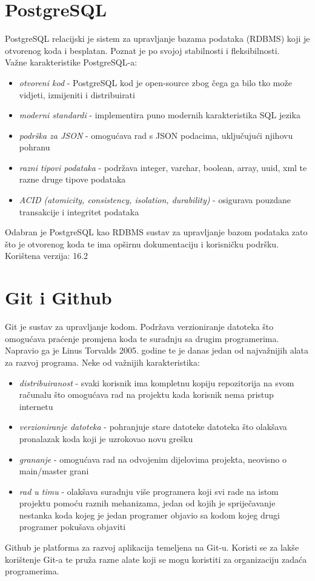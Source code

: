 \documentclass[zavrsnirad]{fer}
\begin{document}
\section{PostgreSQL}
\label{pog:postgresql}
PostgreSQL relacijski je sistem za upravljanje bazama podataka (RDBMS) koji je otvorenog koda i besplatan. Poznat je po svojoj stabilnosti i fleksibilnosti.
\\Važne karakteristike PostgreSQL-a:
\begin{itemize}
	\item \textit{otvoreni kod} - PostgreSQL kod je open-source zbog čega ga bilo tko može vidjeti, izmijeniti i distribuirati
	\item \textit{moderni standardi} - implementira puno modernih karakteristika SQL jezika
	\item \textit{podrška za JSON} - omogućava rad s JSON podacima, uključujući njihovu pohranu
	\item \textit{razni tipovi podataka} - podržava integer, varchar, boolean, array, uuid, xml te razne druge tipove podataka
	\item \textit{ACID (atomicity, consistency, isolation, durability)} - osigurava pouzdane transakcije i integritet podataka
\end{itemize}

Odabran je PostgreSQL kao RDBMS sustav za upravljanje bazom podataka zato što je otvorenog koda te ima opširnu dokumentaciju i korisničku podršku.
\\Korištena verzija: 16.2

\section{Git i Github}
Git je sustav za upravljanje kodom. Podržava verzioniranje datoteka što omogućava praćenje promjena koda te suradnju sa drugim programerima. Napravio ga je Linus Torvalds 2005. godine te je danas jedan od najvažnijih alata za razvoj programa. Neke od važnijih karakteristika:
\begin{itemize}
	\item \textit{distribuiranost} - svaki korisnik ima kompletnu kopiju repozitorija na svom računalu što omogućava rad na projektu kada korisnik nema pristup internetu
	\item \textit{verzioniranje datoteka} - pohranjuje stare datoteke datoteka što olakšava pronalazak koda koji je uzrokovao novu grešku
	\item \textit{grananje} - omogućava rad na odvojenim dijelovima projekta, neovisno o main/master grani
	\item \textit{rad u timu} - olakšava suradnju više programera koji svi rade na istom projektu pomoću raznih mehanizama, jedan od kojih je spriječavanje nestanka koda kojeg je jedan programer objavio sa kodom kojeg drugi programer pokušava objaviti
\end{itemize}
Github je platforma za razvoj aplikacija temeljena na Git-u. Koristi se za lakše korištenje Git-a te pruža razne alate koji se mogu koristiti za organizaciju zadaća programerima.
\end{document}

